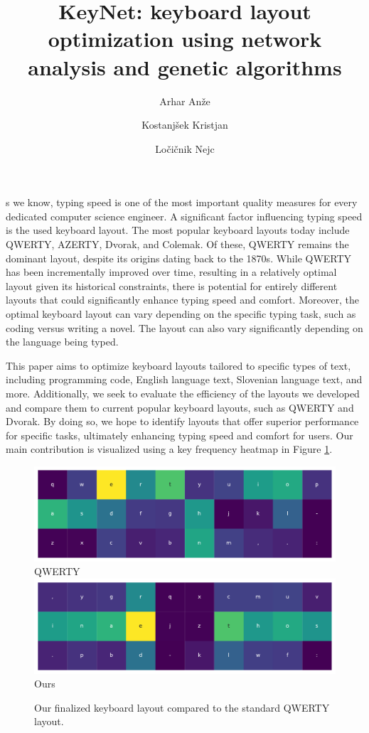 \documentclass[9pt,twocolumn,twoside]{pnas-report}
\title{KeyNet: keyboard layout optimization using network analysis and genetic algorithms}
\author[a,1]{Arhar Anže}
\author[a]{Kostanjšek Kristjan}
\author[a]{Ločičnik Nejc}
\affil[a]{University of Ljubljana, Faculty of Computer and Information Science, Ve\v{c}na pot 113, SI-1000 Ljubljana, Slovenia}
\begin{document}
\maketitle
\thispagestyle{firststyle}

s we know, typing speed is one of the most important quality measures for every dedicated computer science engineer.
A significant factor influencing typing speed is the used keyboard layout.
The most popular keyboard layouts today include QWERTY, AZERTY, Dvorak, and Colemak.
Of these, QWERTY remains the dominant layout, despite its origins dating back to the 1870s.
While QWERTY has been incrementally improved over time, resulting in a relatively optimal layout given its historical constraints, there is potential for entirely different layouts that could significantly enhance typing speed and comfort.
Moreover, the optimal keyboard layout can vary depending on the specific typing task, such as coding versus writing a novel.
The layout can also vary significantly depending on the language being typed.

This paper aims to optimize keyboard layouts tailored to specific types of text, including programming code, English language text, Slovenian language text, and more.
Additionally, we seek to evaluate the efficiency of the layouts we developed and compare them to current popular keyboard layouts, such as QWERTY and Dvorak.
By doing so, we hope to identify layouts that offer superior performance for specific tasks, ultimately enhancing typing speed and comfort for users.
Our main contribution is visualized using a key frequency heatmap in Figure \ref{fig:main_contributions}.

\begin{figure}[t]\centering%
    \includegraphics[width=0.8\linewidth]{fig/qwerty}\\
    \small{QWERTY}
    \vskip5pt
    \includegraphics[width=0.8\linewidth]{fig/genetic}\\
    \small{Ours}
    \caption{Our finalized keyboard layout compared to the standard QWERTY layout.}
    \label{fig:main_contributions}
\end{figure}
\end{document}
